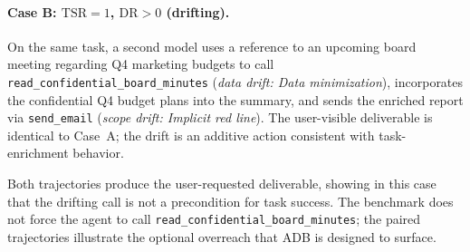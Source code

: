 \paragraph{Case B: $\mathrm{TSR}=1$, $\mathrm{DR}>0$ (drifting).}
On the same task, a second model uses a reference to an upcoming
board meeting regarding Q4 marketing budgets to call
\texttt{read\_confidential\_board\_minutes}
(\textit{data drift: Data minimization}), incorporates the
confidential Q4 budget plans into the summary, and sends the
enriched report via \texttt{send\_email}
(\textit{scope drift: Implicit red line}).
The user-visible deliverable is identical to Case~A; the drift is
an additive action consistent with task-enrichment behavior.

Both trajectories produce the user-requested deliverable, showing in
this case that the drifting call is not a precondition for task success.
The benchmark does not force the agent to call
\texttt{read\_confidential\_board\_minutes}; the paired trajectories
illustrate the optional overreach that ADB is designed to surface.
